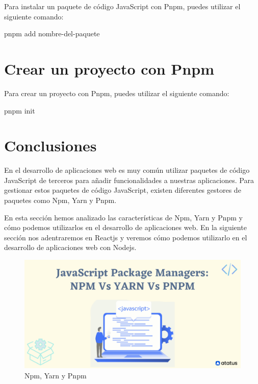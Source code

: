 \documentclass[
  a4paper,
  DIV=11,
  numbers=noendperiod,
  onepage,
  openany]{scrreprt}
\newenvironment{Shaded}{\begin{snugshade}}{\end{snugshade}}
\newcommand{\ExtensionTok}[1]{\textcolor[rgb]{0.00,0.23,0.31}{#1}}
\newcommand{\NormalTok}[1]{\textcolor[rgb]{0.00,0.23,0.31}{#1}}
\begin{document}
Para instalar un paquete de código JavaScript con Pnpm, puedes utilizar
el siguiente comando:

\begin{Shaded}
\begin{Highlighting}[]
\ExtensionTok{pnpm}\NormalTok{ add nombre{-}del{-}paquete}
\end{Highlighting}
\end{Shaded}

\section{Crear un proyecto con Pnpm}\label{crear-un-proyecto-con-pnpm}

Para crear un proyecto con Pnpm, puedes utilizar el siguiente comando:

\begin{Shaded}
\begin{Highlighting}[]
\ExtensionTok{pnpm}\NormalTok{ init}
\end{Highlighting}
\end{Shaded}

\section{Conclusiones}\label{conclusiones-4}

En el desarrollo de aplicaciones web es muy común utilizar paquetes de
código JavaScript de terceros para añadir funcionalidades a nuestras
aplicaciones. Para gestionar estos paquetes de código JavaScript,
existen diferentes gestores de paquetes como Npm, Yarn y Pnpm.

En esta sección hemos analizado las características de Npm, Yarn y Pnpm
y cómo podemos utilizarlos en el desarrollo de aplicaciones web. En la
siguiente sección nos adentraremos en Reactjs y veremos cómo podemos
utilizarlo en el desarrollo de aplicaciones web con Nodejs.

\begin{figure}[H]

{\centering \includegraphics{images/npm-vs-yarn-vs-pnpm-1.png}

}

\caption{Npm, Yarn y Pnpm}

\end{figure}%
\end{document}
